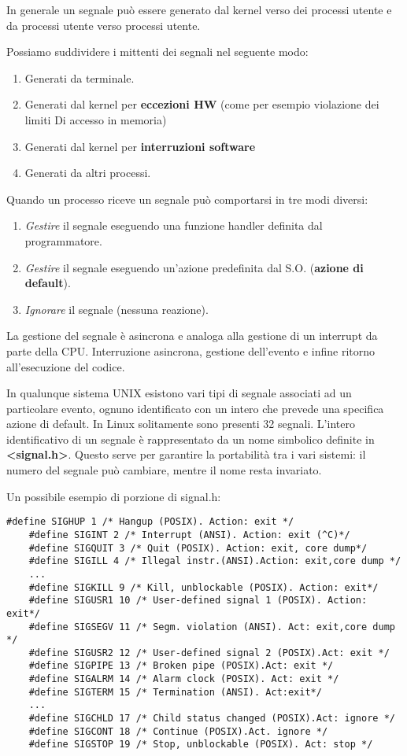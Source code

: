 \documentclass{article}
\begin{document}
\noindent In generale un segnale può essere generato dal kernel verso dei
 processi utente e da processi utente verso processi utente. 

Possiamo suddividere i mittenti dei segnali nel seguente modo:
\begin{enumerate}
    \item Generati da terminale.
    \item Generati dal kernel per \textbf{eccezioni HW}
     (come per esempio violazione dei limiti Di
     accesso in memoria)
    \item Generati dal kernel per \textbf{interruzioni software}
    \item Generati da altri processi.
\end{enumerate}
\medskip

\noindent Quando un processo riceve un segnale può comportarsi in tre modi 
diversi:
\begin{enumerate}
    \item \textit{Gestire} il segnale eseguendo una funzione handler definita dal
    programmatore.
    \item \textit{Gestire} il segnale eseguendo un'azione predefinita
     dal S.O. (\textbf{azione di default}).
    \item \textit{Ignorare} il segnale (nessuna reazione).
\end{enumerate} 

\noindent La gestione del segnale è asincrona e analoga alla gestione 
di un interrupt da parte della CPU. Interruzione asincrona, 
gestione dell'evento e infine ritorno all'esecuzione del codice.
\medskip

\noindent In qualunque sistema UNIX esistono vari tipi di segnale associati
ad un particolare evento, ognuno identificato con un intero 
che prevede una specifica azione di default. In Linux solitamente
sono presenti 32 segnali. L'intero identificativo di un segnale è 
rappresentato da un nome simbolico definite in \textbf{<signal.h>}.
Questo serve per garantire la portabilità tra i vari sistemi: 
il numero del segnale può cambiare, mentre il nome resta invariato.
\medskip

\noindent Un possibile esempio di porzione di signal.h:
\begin{lstlisting}[style=CStyle]
    #define SIGHUP 1 /* Hangup (POSIX). Action: exit */
    #define SIGINT 2 /* Interrupt (ANSI). Action: exit (^C)*/
    #define SIGQUIT 3 /* Quit (POSIX). Action: exit, core dump*/
    #define SIGILL 4 /* Illegal instr.(ANSI).Action: exit,core dump */
    ...
    #define SIGKILL 9 /* Kill, unblockable (POSIX). Action: exit*/
    #define SIGUSR1 10 /* User-defined signal 1 (POSIX). Action: exit*/
    #define SIGSEGV 11 /* Segm. violation (ANSI). Act: exit,core dump */
    #define SIGUSR2 12 /* User-defined signal 2 (POSIX).Act: exit */
    #define SIGPIPE 13 /* Broken pipe (POSIX).Act: exit */
    #define SIGALRM 14 /* Alarm clock (POSIX). Act: exit */
    #define SIGTERM 15 /* Termination (ANSI). Act:exit*/
    ...
    #define SIGCHLD 17 /* Child status changed (POSIX).Act: ignore */
    #define SIGCONT 18 /* Continue (POSIX).Act. ignore */
    #define SIGSTOP 19 /* Stop, unblockable (POSIX). Act: stop */
\end{lstlisting}
\end{document}
